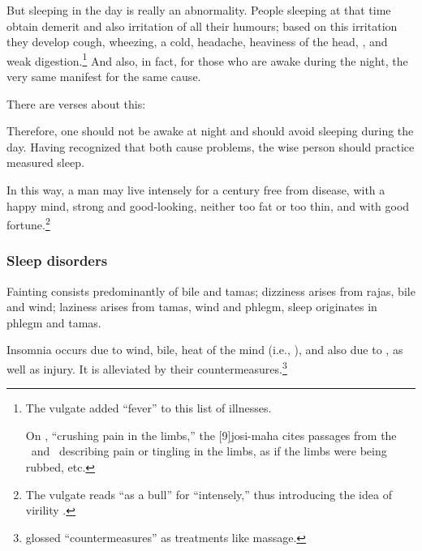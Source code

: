 \begin{translation}
But sleeping in the day is really an abnormality. People sleeping at
that time obtain demerit and also irritation of all their humours;
based on this irritation they develop cough, wheezing, a cold,
headache, heaviness of the head, ,  and weak
digestion.\footnote{The vulgate added “fever” to this list of
    illnesses.
    
    On , “crushing pain in the limbs,” the
[9]{josi-maha} cites passages from the \SS\ and \CS\
describing pain or tingling in the limbs, as if the limbs were
being rubbed, etc.}  And also, in fact, for those who
are awake during the night, the very same 
manifest for the same cause.

\item[39]

There are verses about this:
\begin{sloka}
    Therefore, one should not be awake at night and should avoid sleeping 
    during the day.  Having recognized that both cause problems, 
    the wise person should practice measured sleep.   
\end{sloka}

\item[40]
\begin{sloka}    In this way, a man may live intensely for a century free from
disease, with a happy mind,  strong and good-looking, neither too
fat or too thin, and with good fortune.\footnote{The vulgate reads
    \dev{vṛṣaḥ} “as a bull” for \dev{bhṛśam} “intensely,” thus
    introducing the idea of virility \citep[359]{vulgate}.}
\end{sloka}

\subsubsection{Sleep disorders}

\item[56] 
\begin{sloka}
 Fainting consists predominantly of bile and tamas;
dizziness arises from rajas, bile and wind; laziness arises from
tamas, wind and phlegm, sleep originates in phlegm and tamas.
\end{sloka}

\item[42]

\begin{sloka}
    Insomnia occurs due to wind, bile, heat of the mind (i.e.,
), and also due to , as well
as injury. It is alleviated by their 
countermeasures.\footnote{ glossed 
“countermeasures” as treatments like massage.}
\end{sloka}


\end{translation}
